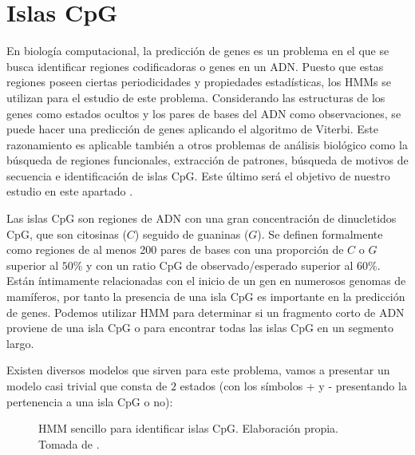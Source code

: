 \section{Islas CpG}
En biología computacional, la predicción de genes es un problema en el que se busca identificar regiones codificadoras o genes en un ADN. Puesto que estas regiones poseen ciertas periodicidades y propiedades estadísticas, los HMMs se utilizan para el estudio de este problema. Considerando las estructuras de los genes como estados ocultos y los pares de bases del ADN como observaciones, se puede hacer una predicción de genes aplicando el algoritmo de Viterbi. Este razonamiento es aplicable también a otros problemas de análisis biológico como la búsqueda de regiones funcionales, extracción de patrones, búsqueda de motivos de secuencia e identificación de islas CpG. Este último será el objetivo de nuestro estudio en este apartado \cite{bioStudies}.

Las islas CpG son regiones de ADN con una gran concentración de dinucletidos CpG, que son citosinas ($C$) seguido de guaninas ($G$). Se definen formalmente como regiones de al menos 200 pares de bases con una proporción de $C$ o $G$ superior al $50\%$ y con un ratio CpG de observado/esperado superior al $60\%$. Están íntimamente relacionadas con el inicio de un gen en numerosos genomas de mamíferos, por tanto la presencia de una isla CpG es importante en la predicción de genes. Podemos utilizar HMM para determinar si un fragmento corto de ADN proviene de una isla CpG o para encontrar todas las islas CpG en un segmento largo.

Existen diversos modelos que sirven para este problema, vamos a presentar un modelo casi trivial que consta de $2$ estados (con los símbolos + y - presentando la pertenencia a una isla CpG o no):

\begin{figure}[H]
\centering
\captionsetup{justification=centering}
\caption{HMM sencillo para identificar islas CpG. Elaboración propia. Tomada de \cite{bioStudies}.}
\end{figure}

